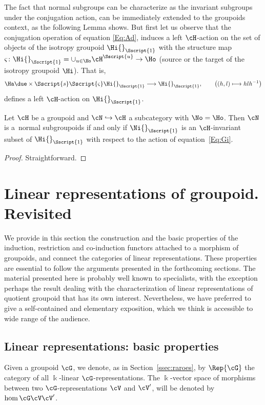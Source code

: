 The fact that normal subgroups can be characterize as the invariant subgroups under the conjugation action, can be immediately extended to the groupoids context, as the following Lemma shows. But first let us observe that the conjugation operation of equation \eqref{Eq:Ad}, induces a left $\cH$-action on the set of objects of the isotropy groupoid $\Hi{}_{\Sscript{1}}$ with the structure map $\varsigma\colon \Hi{}_{\Sscript{1}}=\cup_{u \in \Ho}\cH^{\Sscript{u}} \to \Ho$ (source or the target of the isotropy groupoid $\Hi$). That is,
\begin{gather}\label{Eq:Gi}
\Ha \due \times {\Sscript{s}} { \Sscript{\varsigma}}\Hi{}_{\Sscript{1}} \longrightarrow \Hi{}_{\Sscript{1}},\qquad \big((h,l) \longmapsto hlh^{-1} \big)
\end{gather}
defines a left $\cH$-action on $\Hi{}_{\Sscript{1}}$.
\begin{Lemma}\label{lema:normalsugpd}Let $\cH$ be a groupoid and $\cN \hookrightarrow \cH$ a subcategory with $\No=\Ho$. Then $\cN$ is a~normal subgroupoids if and only if $\Ni{}_{\Sscript{1}}$ is an $\cH$-invariant subset of $\Hi{}_{\Sscript{1}}$ with respect to the action of equation~\eqref{Eq:Gi}.
\end{Lemma}
\begin{proof}Straightforward.
\end{proof}

\section{Linear representations of groupoid. Revisited}\label{sec:rep}
We provide in this section the construction and the basic properties of the induction, restriction and co-induction functors attached to a morphism of groupoids, and connect the categories of linear representations. These properties are essential to follow the arguments presented in the forthcoming sections. The material presented here is probably well known to specialists, with the exception perhaps the result dealing with the characterization of linear representations of quotient groupoid that has its own interest. Nevertheless, we have preferred to give a self-contained and elementary exposition, which we think is accessible to wide range of the audience.

\subsection{Linear representations: basic properties}\label{ssec:Rep}
Given a groupoid $\cG$, we denote, as in Section~\ref{ssec:raroes}, by $\Rep{\cG}$ the category of all $\Bbbk$-linear $\cG$-representations. The $\Bbbk$-vector space of morphisms between two $\cG$-representations $\cV$ and $\cV'$, will be denoted by $\hom{\cG}{\cV}{\cV'}$.

